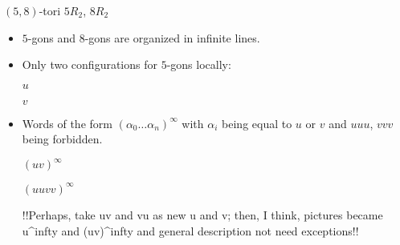 \documentclass[%
pdf,
colorBG,
slideColor,
]{prosper}
\begin{document}
\begin{slide}{$(5,8)$-tori $5R_2$, $8R_2$}
\begin{itemize}
\item $5$-gons and $8$-gons are organized in infinite lines.
\item Only two configurations for $5$-gons locally:
\begin{center}
\begin{minipage}{5.2cm}
\centering
{}\par
$u$
\end{minipage}
\begin{minipage}{5.2cm}
\centering
{}\par
$v$
\end{minipage}
\end{center}
\item Words of the form $(\alpha_0\dots\alpha_n)^{\infty}$ with $\alpha_i$ being equal to $u$ or $v$ and $uuu$, $vvv$ being forbidden.
\begin{center}
\begin{minipage}{5.2cm}
\centering
{}\par
$(uv)^{\infty}$
\end{minipage}
\begin{minipage}{5.2cm}
\centering
{}\par
$(uuvv)^{\infty}$
\end{minipage}
\end{center}
!!Perhaps, take uv and vu as new u and v; then, I think, pictures became
u^infty and (uv)^infty and general description not need exceptions!!

\end{itemize}
\end{slide}
\end{document}
